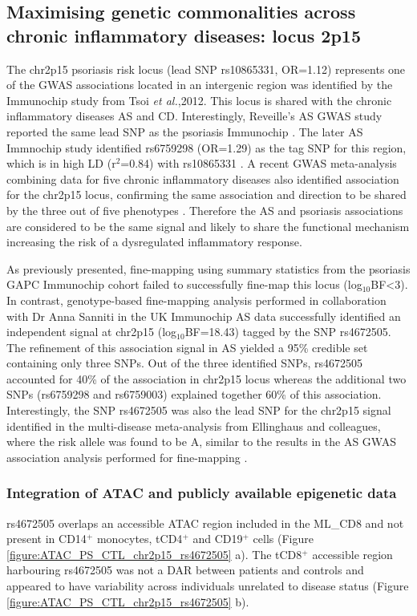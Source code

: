 \subsection{Maximising genetic commonalities across chronic inflammatory diseases: locus 2p15}
The chr2p15 psoriasis risk locus (lead SNP rs10865331, OR=1.12) represents one of the GWAS associations located in an intergenic region was identified by the Immunochip study from Tsoi \textit{et al.},2012. This locus is shared with the chronic inflammatory diseases AS and CD. Interestingly, Reveille's AS GWAS study reported the same lead SNP as the psoriasis Immunochip \parencite{Reveille2010}. The later AS Immnochip study identified rs6759298 (OR=1.29) as the tag SNP for this region, which is in high LD (r$^2$=0.84) with rs10865331 \parencite{Cortes2012}. A recent GWAS meta-analysis combining data for five chronic inflammatory diseases also identified association for the chr2p15 locus, confirming the same association and direction to be shared by the three out of five phenotypes \parencite{Ellinghaus2016}. Therefore the AS and psoriasis associations are considered to be the same signal and likely to share the functional mechanism increasing the risk of a dysregulated inflammatory response.

As previously presented, fine-mapping using summary statistics from the psoriasis GAPC Immunochip cohort failed to successfully fine-map this locus (log$_{10}$BF<3). In contrast, genotype-based fine-mapping analysis performed in collaboration with Dr Anna Sanniti in the UK Immunochip AS data successfully identified an independent signal at chr2p15 (log$_{10}$BF=18.43) tagged by the SNP rs4672505. The refinement of this association signal in AS yielded a 95\% credible set containing only three SNPs. Out of the three identified SNPs, rs4672505 accounted for 40\% of the association in chr2p15 locus whereas the additional two SNPs (rs6759298 and rs6759003) explained together 60\% of this association. Interestingly, the SNP rs4672505 was also the lead SNP for the chr2p15 signal identified in the multi-disease meta-analysis from Ellinghaus and colleagues, where the risk allele was found to be A, similar to the results in the AS GWAS association analysis performed for fine-mapping \parencite{Ellinghaus2016}.

\subsubsection{Integration of ATAC and publicly available epigenetic data}
rs4672505 overlaps an accessible ATAC region included in the ML\_CD8 and not present in CD14$^+$ monocytes, tCD4$^+$ and CD19$^+$ cells (Figure \ref{figure:ATAC_PS_CTL_chr2p15_rs4672505} a). The tCD8$^+$ accessible region harbouring rs4672505 was not a DAR between patients and controls and appeared to have variability across individuals unrelated to disease status (Figure \ref{figure:ATAC_PS_CTL_chr2p15_rs4672505} b). 


